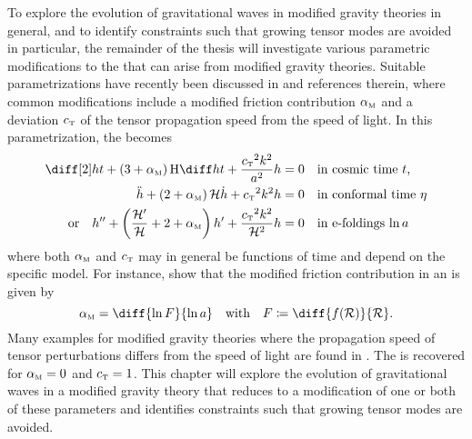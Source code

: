 To explore the evolution of gravitational waves in modified gravity theories in general, and to identify constraints such that growing tensor modes are avoided in particular, the remainder of the thesis will investigate various parametric modifications to the  that can arise from modified gravity theories. Suitable parametrizations have recently been discussed in \textcite{Bellini2014,Saltas2014,Amendola2014,Raveri2014,Pettorino2014,Linder2014,Amendola2015,Xu2015} and references therein, where common modifications include a modified friction contribution \({\alpha_{\textnormal{\tiny{M}}}}\) and a deviation \({c_{\textnormal{\tiny{T}}}}\) of the tensor propagation speed from the speed of light. In this parametrization, the  becomes \autocite{Amendola2014,Raveri2014,Pettorino2014}%
\begin{subequations}\label{eq:evolution_friction}%
\begin{align}%
	\ddt{h} + \del{3 + \alphaM} \Hcosm \dt{h} + \frac{\cT^2 k^2}{a^2} h &= 0 \quad \text{in cosmic time \(t\),} \\
	\ddconf{h} + \del{2 + \alphaM} \Hconf \dconf{h} + \cT^2 k^2 h &= 0 \quad \text{in conformal time \(\conft\)} \\
    \text{or} \quad \ddefold{h} + \del{\frac{\defold{\Hconf}}{\Hconf} + 2 + \alphaM} \defold{h} + \frac{\cT^2 k^2}{\Hconf^2} h &= 0 \quad \text{in e-foldings \(\efold\)}
\end{align}
\end{subequations}
where both \({\alpha_{\textnormal{\tiny{M}}}}\) and \({c_{\textnormal{\tiny{T}}}}\) may in general be functions of time and depend on the specific model. For instance, \textcite{Hwang1996} show that the modified friction contribution in an  is given by
\begin{equation}
	\alphaM = \diff{\ln{F}}{\efold} \quad \text{with} \quad F \defeq \diff{f(\Rscal)}{\Rscal}
	\eqpunct{.}
\end{equation}
Many examples for modified gravity theories where the propagation speed of tensor perturbations differs from the speed of light are found in \textcite{Raveri2014,Amendola2014,Linder2014}. The  is recovered for \({\alpha_{\textnormal{\tiny{M}}}}=0\) and \({c_{\textnormal{\tiny{T}}}}=1\). This chapter will explore the evolution of gravitational waves in a modified gravity theory that reduces to a modification of one or both of these parameters and identifies constraints such that growing tensor modes are avoided.


